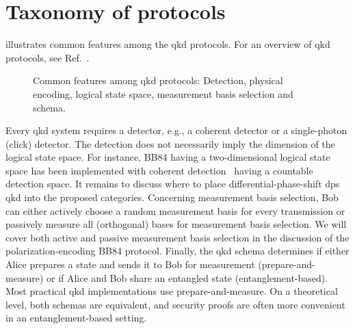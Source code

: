 \section{Taxonomy of protocols}

 illustrates common features among the \gls{qkd} protocols.
For an overview of \gls{qkd} protocols, see Ref.~\cite{Duvsek2006}.
\begin{figure}[htb]
	\centering
	
	\caption{Common features among \gls{qkd} protocols: Detection, physical encoding, logical state space, measurement basis selection and schema.}\label{fig:qkd_classification}
\end{figure}
Every \gls{qkd} system requires a detector, e.g., a coherent detector or a single-photon (click) detector.
The detection does not necessarily imply the dimension of the logical state space.
For instance, BB84 having a two-dimensional logical state space has been implemented with coherent detection~\cite{Qi2021} having a countable detection space.
It remains to discuss where to place differential-phase-shift \gls{dps} \gls{qkd} into the proposed categories.
Concerning measurement basis selection, Bob can either actively choose a random measurement basis for every transmission or passively measure all (orthogonal) bases for measurement basis selection.
We will cover both active and passive measurement basis selection in the discussion of the polarization-encoding BB84 protocol.
Finally, the \gls{qkd} schema determines if either Alice prepares a state and sends it to Bob for measurement (prepare-and-measure) or if Alice and Bob share an entangled state (entanglement-based).
Most practical \gls{qkd} implementations use prepare-and-measure.
On a theoretical level, both schemas are equivalent, and security proofs are often more convenient in an entanglement-based setting.

